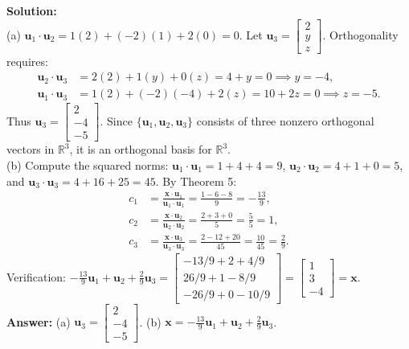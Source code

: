 \documentclass[11pt, letterpaper]{article}
\theoremstyle{definition}
\theoremstyle{remark}
\begin{document}
\textbf{Solution:} \\
(a) $\mathbf{u}_1 \cdot \mathbf{u}_2 = 1(2) + (-2)(1) + 2(0) = 0$. Let $\mathbf{u}_3 = \begin{bmatrix} 2 \\ y \\ z \end{bmatrix}$. Orthogonality requires:
\begin{align*}
\mathbf{u}_2 \cdot \mathbf{u}_3 &= 2(2) + 1(y) + 0(z) = 4 + y = 0 \implies y = -4, \\
\mathbf{u}_1 \cdot \mathbf{u}_3 &= 1(2) + (-2)(-4) + 2(z) = 10 + 2z = 0 \implies z = -5.
\end{align*}
Thus $\mathbf{u}_3 = \begin{bmatrix} 2 \\ -4 \\ -5 \end{bmatrix}$. Since $\{\mathbf{u}_1, \mathbf{u}_2, \mathbf{u}_3\}$ consists of three nonzero orthogonal vectors in $\mathbb{R}^3$, it is an orthogonal basis for $\mathbb{R}^3$. \\
(b) Compute the squared norms: $\mathbf{u}_1 \cdot \mathbf{u}_1 = 1 + 4 + 4 = 9$, $\mathbf{u}_2 \cdot \mathbf{u}_2 = 4 + 1 + 0 = 5$, and $\mathbf{u}_3 \cdot \mathbf{u}_3 = 4 + 16 + 25 = 45$. By Theorem 5:
\begin{align*}
c_1 &= \frac{\mathbf{x} \cdot \mathbf{u}_1}{\mathbf{u}_1 \cdot \mathbf{u}_1} = \frac{1 - 6 - 8}{9} = -\frac{13}{9}, \\
c_2 &= \frac{\mathbf{x} \cdot \mathbf{u}_2}{\mathbf{u}_2 \cdot \mathbf{u}_2} = \frac{2 + 3 + 0}{5} = \frac{5}{5} = 1, \\
c_3 &= \frac{\mathbf{x} \cdot \mathbf{u}_3}{\mathbf{u}_3 \cdot \mathbf{u}_3} = \frac{2 - 12 + 20}{45} = \frac{10}{45} = \frac{2}{9}.
\end{align*}
Verification: $-\frac{13}{9}\mathbf{u}_1 + \mathbf{u}_2 + \frac{2}{9}\mathbf{u}_3 = \begin{bmatrix} -13/9 + 2 + 4/9 \\ 26/9 + 1 - 8/9 \\ -26/9 + 0 - 10/9 \end{bmatrix} = \begin{bmatrix} 1 \\ 3 \\ -4 \end{bmatrix} = \mathbf{x}$. \\
\textbf{Answer:} (a) $\mathbf{u}_3 = \begin{bmatrix} 2 \\ -4 \\ -5 \end{bmatrix}$. (b) $\mathbf{x} = -\frac{13}{9}\mathbf{u}_1 + \mathbf{u}_2 + \frac{2}{9}\mathbf{u}_3$.
\end{document}
